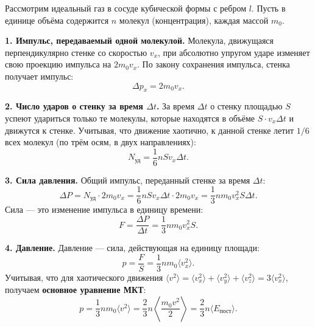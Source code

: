 \begin{theorem}
Рассмотрим идеальный газ в сосуде кубической формы с ребром $l$. Пусть в единице объёма содержится $n$ молекул (концентрация), каждая массой $m_0$.

\textbf{1. Импульс, передаваемый одной молекулой.}
Молекула, движущаяся перпендикулярно стенке со скоростью $v_x$, при абсолютно упругом ударе изменяет свою проекцию импульса на $2m_0 v_x$. По закону сохранения импульса, стенка получает импульс:
\begin{equation}
    \Delta p_x = 2 m_0 v_x.
\end{equation}

\textbf{2. Число ударов о стенку за время $\Delta t$.}
За время $\Delta t$ о стенку площадью $S$ успеют удариться только те молекулы, которые находятся в объёме $S \cdot v_x \Delta t$ и движутся к стенке. Учитывая, что движение хаотично, к данной стенке летит $1/6$ всех молекул (по трём осям, в двух направлениях):
\begin{equation}
    N_{\text{уд}} = \frac{1}{6} n S v_x \Delta t.
\end{equation}

\textbf{3. Сила давления.}
Общий импульс, переданный стенке за время $\Delta t$:
\begin{equation}
    \Delta P = N_{\text{уд}} \cdot 2 m_0 v_x = \frac{1}{6} n S v_x \Delta t \cdot 2 m_0 v_x = \frac{1}{3} n m_0 v_x^2 S \Delta t.
\end{equation}
Сила --- это изменение импульса в единицу времени:
\begin{equation}
    F = \frac{\Delta P}{\Delta t} = \frac{1}{3} n m_0 v_x^2 S.
\end{equation}

\textbf{4. Давление.}
Давление --- сила, действующая на единицу площади:
\begin{equation}
    p = \frac{F}{S} = \frac{1}{3} n m_0 \langle v_x^2 \rangle.
\end{equation}
Учитывая, что для хаотического движения $\langle v^2 \rangle = \langle v_x^2 \rangle + \langle v_y^2 \rangle + \langle v_z^2 \rangle = 3\langle v_x^2 \rangle$, получаем \textbf{основное уравнение МКТ}:
\begin{equation}
    p = \frac{1}{3} n m_0 \langle v^2 \rangle = \frac{2}{3} n \left\langle \frac{m_0 v^2}{2} \right\rangle = \frac{2}{3} n \langle E_{\text{пост}} \rangle. \label{eq:mkt_main_39}
\end{equation}
\end{theorem}

